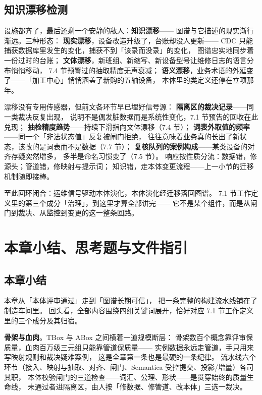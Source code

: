 \subsection{知识漂移检测}

设施都齐了，最后还剩一个安静的敌人：\textbf{知识漂移}——
图谱与它描述的现实渐行渐远。三种形态：
\textbf{现实漂移}，设备改造升级了，台账却没人更新——
CDC 只能捕获数据库里发生的变化，捕获不到「该录而没录」的变化，
图谱忠实地同步着一份过时的台账；
\textbf{文体漂移}，新班组、新缩写、新设备型号让维修日志的语言分布悄悄移动，
7.4 节预警过的抽取精度无声衰减；
\textbf{语义漂移}，业务术语的外延变了——「加工中心」悄悄涵盖了新购的五轴设备，
本体里的类定义还停在立项那年。

漂移没有专用传感器，但前文各环节早已埋好信号源：
\textbf{隔离区的裁决记录}——同一类裁决反复出现，
说明不是偶发脏数据而是系统性变化，7.1 节预告的回收在此兑现；
\textbf{抽检精度趋势}——持续下滑指向文体漂移（7.4 节）；
\textbf{词表外取值的频率}——同一个「非法状态值」反复被闸门拒绝，
往往意味着业务真的长出了新状态，该改的是词表而不是数据（7.7 节）；
\textbf{复核队列的案例构成}——某类设备的对齐存疑突然增多，
多半是命名习惯变了（7.5 节）。
响应按性质分流：数据错，修源头；管道错，修映射与提示词；
知识错，走本体变更流程——上一小节的迁移机制随即接棒。

至此回环闭合：运维信号驱动本体演化，本体演化经迁移落回图谱。
7.1 节工作定义里的第三个成分「治理」，到这里才算全部讲完——
它不是某个组件，而是从闸门到裁决、从监控到变更的这一整条回路。

\section{本章小结、思考题与文件指引}

\subsection{本章小结}

本章从「本体评审通过」走到「图谱长期可信」，
把一条完整的构建流水线铺在了制造车间里。
回头看，全部内容围绕四组关键词展开，恰好对应 7.1 节工作定义里的三个成分及其归宿。

\textbf{骨架与血肉}。TBox 与 ABox 之间横着一道规模断层：
骨架数百个概念靠评审保质量，血肉百万级三元组只能靠管道保质量——
实例数据永远走管道，手只用来写映射规则和裁决疑难案例，
这是全章第一条也是最硬的一条纪律。
流水线六个环节（接入、映射与抽取、对齐、闸门、Semantica 受控提交、投影/增量）各司其职，
本体校验闸门的三道检查——词汇、公理、形状——是贯穿始终的质量生命线，
未通过者进隔离区，由人按「修数据、修管道、改本体」三选一裁决。

